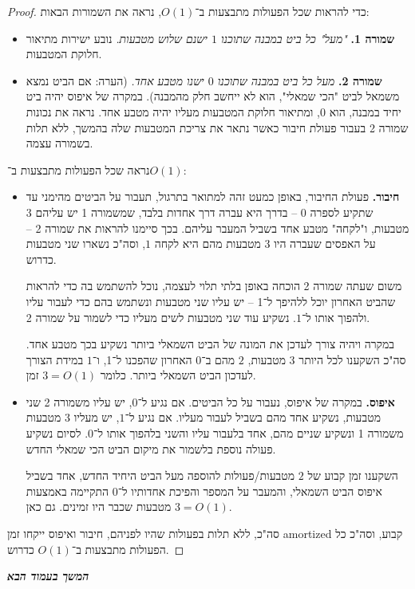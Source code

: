 \documentclass[]{article}
\newcommand\npage {\vfil {\hfil \textbf{\textit{המשך בעמוד הבא}}} \hfil \vfil \pagebreak}
\theoremstyle{definition}
\begin{document}
\begin{enumerate}[A.]
\begin{proof}
			כדי להראות שכל הפעולות מתבצעות ב־$O(1)$, נראה את השמורות הבאות: 
			\begin{itemize}
				\item \textbf{שמורה 1. }\textit{"מעל" כל ביט במבנה שתוכנו $1$ ישנם שלוש מטבעות. }נובע ישירות מתיאור חלוקת המטבעות. 
				\item \textbf{שמורה 2. }\textit{מעל כל ביט במבנה שתוכנו $0$ ישנו מטבע אחד. }(הערה: אם הביט נמצא משמאל לביט "הכי שמאלי", הוא לא ייחשב חלק מהמבנה). במקרה של איפוס יהיה ביט יחיד במבנה, הוא $0$, ומתיאור חלוקת המטבעות מעליו יהיה מטבע אחד. נראה את נכונות שמורה 2 בעבור פעולת חיבור כאשר נתאר את צריכת המטבעות שלה בהמשך, ללא תלות בשמורה עצמה. 
			\end{itemize}
			נראה שכל הפעולות מתבצעות ב־$O(1)$: 
			\begin{itemize}
				\item \textbf{חיבור. }פעולת החיבור, באופן כמעט זהה למתואר בתרגול, תעבור על הביטים מהימני עד שתקיע לספרה $0$ – בדרך היא עברה דרך אחדות בלבד, שמשמורה 1 יש עליהם $3$ מטבעות, ו"לקחה" מטבע אחד בשביל המעבר עליהם. בכך סיימנו להראות את שמורה 2 – על האפסים שעברה היו $3$ מטבעות מהם היא לקחה $1$, וסה"כ נשארו שני מטבעות כדרוש. 
				
				משום שעתה שמורה 2 הוכחה באופן בלתי תלוי לעצמה, נוכל להשתמש בה כדי להראות שהביט האחרון יוכל ללהיפך ל־1 – יש עליו שני מטבעות ונשתמש בהם כדי לעבור עליו ולהפוך אותו ל־$1$. נשקיע עוד שני מטבעות לשים מעליו כדי לשמור על שמורה 2. 
				
				במקרה ויהיה צורך לעדכן את המונה של הביט השמאלי ביותר נשקיע בכך מטבע אחד. סה"כ השקענו לכל היותר $3$ מטבעות, $2$ מהם ב־0 האחרון שהפכנו ל־1, ו־$1$ במידת הצורך לעדכון הביט השמאלי ביותר. כלומר $3 = O(1)$ זמן. 
				\item \textbf{איפוס. }במקרה של איפוס, נעבור על כל הביטים. אם נגיע ל־$0$, יש עליו משמורה 2 שני מטבעות, נשקיע אחד מהם בשביל לעבור מעליו. אם נגיע ל־$1$, יש מעליו 3 מטבעות משמורה 1 ונשקיע שניים מהם, אחד בלעבור עליו והשני בלהפוך אותו ל־$0$. לסיום נשקיע פעולה נוספת בלשמור את מיקום הביט הכי שמאלי החדש. 
				
				השקענו זמן קבוע של $2$ מטבעות/פעולות להוספה מעל הביט היחיד החדש, אחד בשביל איפוס הביט השמאלי, והמעבר על המספר והפיכת אחדותיו ל־0 התקיימה באמצעות מטבעות שכבר היו זמינים. גם כאן $3 = O(1)$. 
			\end{itemize}
			סה"כ, ללא תלות בפעולות שהיו לפניהם, חיבור ואיפוס ייקחו זמן amortized קבוע, וסה"כ כל הפעולות מתבצעות ב־$O(1)$ כדרוש. 
		\end{proof}
	\end{enumerate}
	\npage
	
\end{document}
